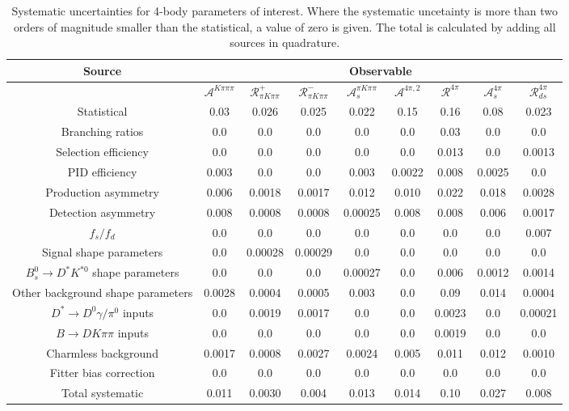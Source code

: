 \begin{sidewaystable}
  \centering
  \begin{tabular}{ccccccccc}
      \toprule
      Source & \multicolumn{8}{c}{Observable} \\
      \midrule
       & $\mathcal{A}^{K\pi\pi\pi}$ & $\mathcal{R}_{\pi K\pi\pi}^+$ & $\mathcal{R}_{\pi K\pi\pi}^-$ & $\mathcal{A}_s^{\pi K\pi\pi}$ & $\mathcal{A}^{4\pi,2}$ & $\mathcal{R}^{4\pi}$ & $\mathcal{A}_s^{4\pi}$ & $\mathcal{R}_{ds}^{4\pi}$ \\
      \midrule
      Statistical & 0.03 & 0.026 & 0.025 & 0.022 & 0.15 & 0.16 & 0.08 & 0.023 \\
      \midrule
      Branching ratios & 0.0  & 0.0  & 0.0  & 0.0  & 0.0  & 0.03 & 0.0  & 0.0  \\
      Selection efficiency & 0.0  & 0.0  & 0.0  & 0.0  & 0.0  & 0.013 & 0.0  & 0.0013 \\
      PID efficiency & 0.003 & 0.0  & 0.0  & 0.003 & 0.0022 & 0.008 & 0.0025 & 0.0  \\
      Production asymmetry & 0.006 & 0.0018 & 0.0017 & 0.012 & 0.010 & 0.022 & 0.018 & 0.0028 \\
      Detection asymmetry & 0.008 & 0.0008 & 0.0008 & 0.00025 & 0.008 & 0.008 & 0.006 & 0.0017 \\
      $f_s/f_d$ & 0.0  & 0.0  & 0.0  & 0.0  & 0.0  & 0.0  & 0.0  & 0.007 \\
      Signal shape parameters & 0.0  & 0.00028 & 0.00029 & 0.0  & 0.0  & 0.0  & 0.0  & 0.0  \\
      $B^0_s \to D^* K^{*0}$ shape parameters & 0.0  & 0.0  & 0.0  & 0.00027 & 0.0  & 0.006 & 0.0012 & 0.0014 \\
      Other background shape parameters & 0.0028 & 0.0004 & 0.0005 & 0.003 & 0.0  & 0.09 & 0.014 & 0.0004 \\
      $D^* \to D^0 \gamma/\pi^0$ inputs & 0.0  & 0.0019 & 0.0017 & 0.0  & 0.0  & 0.0023 & 0.0  & 0.00021 \\
      $B\to DK\pi\pi$ inputs & 0.0  & 0.0  & 0.0  & 0.0  & 0.0  & 0.0019 & 0.0  & 0.0  \\
      Charmless background & 0.0017 & 0.0008 & 0.0027 & 0.0024 & 0.005 & 0.011 & 0.012 & 0.0010 \\
      Fitter bias correction & 0.0  & 0.0  & 0.0  & 0.0  & 0.0  & 0.0  & 0.0  & 0.0  \\
      \midrule
      Total systematic & 0.011 & 0.0030 & 0.004 & 0.013 & 0.014 & 0.10 & 0.027 & 0.008 \\
      \bottomrule
  \end{tabular}
  \caption{Systematic uncertainties for 4-body parameters of interest. Where the systematic uncetainty is more than two orders of magnitude smaller than the statistical, a value of zero is given. The total is calculated by adding all sources in quadrature.}
\label{tab:fourBody_systematics}
\end{sidewaystable}
